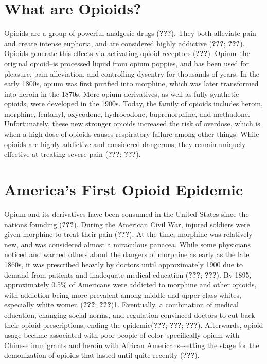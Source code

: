 \documentclass[12pt,twoside]{reedthesis}
\begin{document}
\hypertarget{what-are-opioids}{%
\section{What are Opioids?}\label{what-are-opioids}}

Opioids are a group of powerful analgesic drugs ({\textbf{???}}). They both alleviate pain and create intense euphoria, and are considered highly addictive ({\textbf{???}}; {\textbf{???}}). Opioids generate this effects via activating opioid receptors ({\textbf{???}}). Opium--the original opioid--is processed liquid from opium poppies, and has been used for pleasure, pain alleviation, and controlling dysentry for thousands of years. In the early 1800s, opium was first purified into morphine, which was later transformed into heroin in the 1870s. More opium derivatives, as well as fully synthetic opioids, were developed in the 1900s. Today, the family of opioids includes heroin, morphine, fentanyl, oxycodone, hydrocodone, buprenorphine, and methadone. Unfortunately, these new stronger opioids increased the risk of overdose, which is when a high dose of opioids causes respiratory failure among other things. While opioids are highly addictive and considered dangerous, they remain uniquely effective at treating severe pain ({\textbf{???}}; {\textbf{???}}).

\hypertarget{americas-first-opioid-epidemic}{%
\section{America's First Opioid Epidemic}\label{americas-first-opioid-epidemic}}

Opium and its derivatives have been consumed in the United States since the nations founding ({\textbf{???}}). During the American Civil War, injured soldiers were given morphine to treat their pain ({\textbf{???}}). At the time, morphine was relatively new, and was considered almost a miraculous panacea. While some physicians noticed and warned others about the dangers of morphine as early as the late 1860s, it was prescribed heavily by doctors until approximately 1900 due to demand from patients and inadequate medical education ({\textbf{???}}; {\textbf{???}}). By 1895, approximately 0.5\% of Americans were addicted to morphine and other opioids, with addiction being more prevalent among middle and upper class whites, especially white women ({\textbf{???}}; {\textbf{???}})1. Eventually, a combination of medical education, changing social norms, and regulation convinced doctors to cut back their opioid prescriptions, ending the epidemic({\textbf{???}}; {\textbf{???}}; {\textbf{???}}). Afterwards, opioid usage became associated with poor people of color--specifically opium with Chinese immigrants and heroin with African Americans--setting the stage for the demonization of opioids that lasted until quite recently ({\textbf{???}}).
\end{document}
